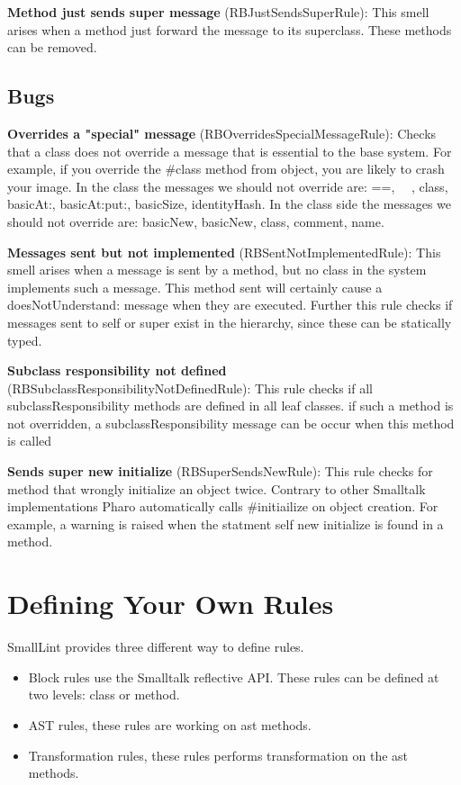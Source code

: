 \documentclass[a4paper,10pt,twoside]{book}
\begin{document}
\textbf{Method just sends super message} (RBJustSendsSuperRule): This smell arises when a method just forward the message to its superclass. These methods can be removed.

\subsection{Bugs}
\textbf{Overrides a "special" message} (RBOverridesSpecialMessageRule): Checks that a class does not override a message that is essential to the base system. For example, if you override the \#class method from object, you are likely to crash your image.
In the class the messages we should not override are: ==, ~~, class, basicAt:, basicAt:put:, basicSize, identityHash.
In the class side the messages we should not override are: basicNew, basicNew, class, comment, name.

\textbf{Messages sent but not implemented} (RBSentNotImplementedRule): This smell arises when a message is sent by a method,  but no class in the system implements such a message. This method sent will certainly cause a doesNotUnderstand: message when they are executed.  Further this rule checks if messages sent to self or super exist in the hierarchy, since these can be statically typed.

\textbf{Subclass responsibility not defined} (RBSubclassResponsibilityNotDefinedRule): This rule checks if all subclassResponsibility methods are defined in all leaf classes. if such a method is not overridden, a subclassResponsibility message can be occur when this method is called

\textbf{Sends super new initialize} (RBSuperSendsNewRule):  This rule checks for method that wrongly initialize an object twice. Contrary to other Smalltalk implementations Pharo automatically calls \#initiailize on object creation.
For example, a warning is raised when the statment self new initialize is found in a method.




\section{Defining Your Own Rules}
SmallLint provides three different way to define rules.
\begin{itemize}
	\item Block rules use the Smalltalk reflective API. These rules can be defined at two levels: class or method.
	\item AST rules, these rules are working on ast methods. 
	\item Transformation rules, these rules performs transformation on the ast methods.
\end{itemize}
\end{document}

